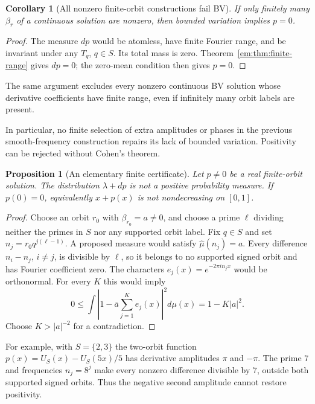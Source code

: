 \documentclass[11pt,a4paper]{article}
\newtheorem{proposition}[theorem]{Proposition}
\newtheorem{corollary}[theorem]{Corollary}
\theoremstyle{definition}
\theoremstyle{remark}
\theoremstyle{plain}
\numberwithin{equation}{section}
\begin{document}
\begin{corollary}[All nonzero finite-orbit constructions fail BV]
If only finitely many $\beta_r$ of a continuous solution are nonzero,
then bounded variation implies $p=0$.
\end{corollary}
\begin{proof}
The measure $dp$ would be atomless, have finite Fourier range, and be
invariant under any $T_q$, $q\in S$. Its total mass is zero.
Theorem~\ref{em:thm:finite-range} gives $dp=0$; the zero-mean condition
then gives $p=0$.
\end{proof}
The same argument excludes every nonzero continuous BV solution whose
derivative coefficients have finite range, even if infinitely many orbit
labels are present.

In particular, no finite selection of extra amplitudes or phases in
the previous smooth-frequency construction repairs its lack of
bounded variation. Positivity can be rejected without Cohen's theorem.

\begin{proposition}[An elementary finite certificate]
Let $p\ne0$ be a real finite-orbit solution. The distribution
$\lambda+dp$ is not a positive probability measure. If $p(0)=0$,
equivalently $x+p(x)$ is not nondecreasing on $[0,1]$.
\end{proposition}
\begin{proof}
Choose an orbit $r_0$ with $\beta_{r_0}=a\ne0$, and choose a prime
$\ell$ dividing neither the primes in $S$ nor any supported orbit
label. Fix $q\in S$ and set $n_j=r_0q^{j(\ell-1)}$.
A proposed measure would satisfy $\widehat\mu(n_j)=a$.
Every difference $n_i-n_j$, $i\ne j$, is divisible by $\ell$, so
it belongs to no supported signed orbit and has Fourier coefficient
zero. The characters $e_j(x)=e^{-2\pi in_jx}$ would be orthonormal.
For every $K$ this would imply
\[
 0\le\int\left|1-\overline a\sum_{j=1}^K e_j(x)\right|^2d\mu(x)
 =1-K|a|^2.
\]
Choose $K>|a|^{-2}$ for a contradiction.
\end{proof}
For example, with $S=\{2,3\}$ the two-orbit function
$p(x)=U_S(x)-U_S(5x)/5$ has derivative amplitudes $\pi$ and $-\pi$.
The prime $7$ and frequencies $n_j=8^j$ make every nonzero difference
divisible by $7$, outside both supported signed orbits. Thus the negative
second amplitude cannot restore positivity.
\end{document}
